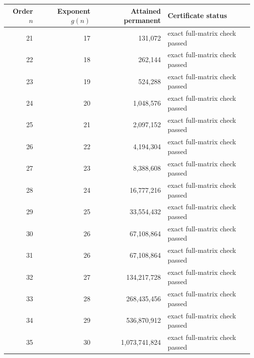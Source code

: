 \begin{tabular}{rrrl}
\toprule
Order $n$ & Exponent $g(n)$ & Attained permanent & Certificate status\\
\midrule
21 & 17 & 131,072 & exact full-matrix check passed \\
22 & 18 & 262,144 & exact full-matrix check passed \\
23 & 19 & 524,288 & exact full-matrix check passed \\
24 & 20 & 1,048,576 & exact full-matrix check passed \\
25 & 21 & 2,097,152 & exact full-matrix check passed \\
26 & 22 & 4,194,304 & exact full-matrix check passed \\
27 & 23 & 8,388,608 & exact full-matrix check passed \\
28 & 24 & 16,777,216 & exact full-matrix check passed \\
29 & 25 & 33,554,432 & exact full-matrix check passed \\
30 & 26 & 67,108,864 & exact full-matrix check passed \\
31 & 26 & 67,108,864 & exact full-matrix check passed \\
32 & 27 & 134,217,728 & exact full-matrix check passed \\
33 & 28 & 268,435,456 & exact full-matrix check passed \\
34 & 29 & 536,870,912 & exact full-matrix check passed \\
35 & 30 & 1,073,741,824 & exact full-matrix check passed \\
\bottomrule
\end{tabular}
